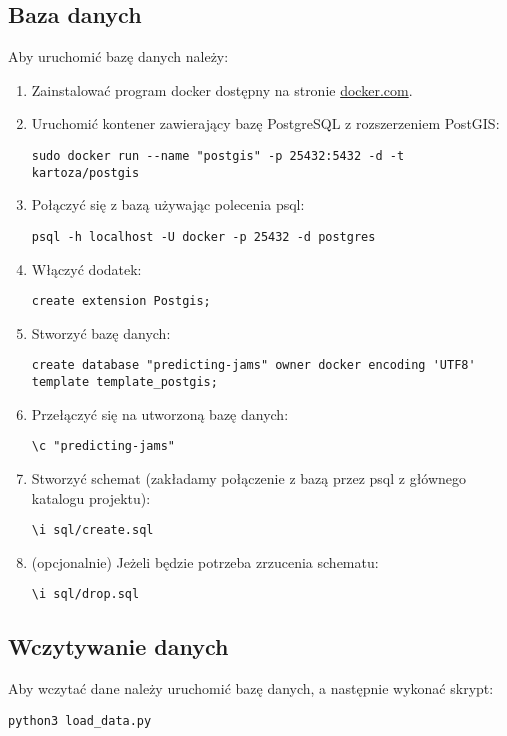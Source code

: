 \documentclass[a4paper,12pt]{mwart}
\begin{document}
\subsection{Baza danych}
Aby uruchomić bazę danych należy:
\begin{enumerate}
\item Zainstalować program docker dostępny na stronie \href{https://www.docker.com/}{docker.com}.
\item Uruchomić kontener zawierający bazę PostgreSQL z rozszerzeniem PostGIS:
\begin{lstlisting}
sudo docker run --name "postgis" -p 25432:5432 -d -t kartoza/postgis
\end{lstlisting}
\item Połączyć się z bazą używając polecenia psql:
\begin{lstlisting}
psql -h localhost -U docker -p 25432 -d postgres
\end{lstlisting}
\item Włączyć dodatek:
\begin{lstlisting}
create extension Postgis;
\end{lstlisting}
\item Stworzyć bazę danych:
\begin{lstlisting}
create database "predicting-jams" owner docker encoding 'UTF8' template template_postgis;
\end{lstlisting}
\item Przełączyć się na utworzoną bazę danych:
\begin{lstlisting}
\c "predicting-jams"
\end{lstlisting}
\item Stworzyć schemat (zakładamy połączenie z bazą przez psql z głównego katalogu projektu):
\begin{lstlisting}
\i sql/create.sql
\end{lstlisting}
\item (opcjonalnie) Jeżeli będzie potrzeba zrzucenia schematu:
\begin{lstlisting}
\i sql/drop.sql
\end{lstlisting}
\end{enumerate}

\subsection{Wczytywanie danych}
Aby wczytać dane należy uruchomić bazę danych, a następnie wykonać skrypt:
\begin{lstlisting}
python3 load_data.py
\end{lstlisting}
\end{document}
